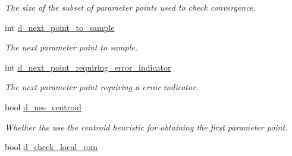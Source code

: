 \begin{DoxyCompactItemize}
\begin{DoxyCompactList}\small\item\em The size of the subset of parameter points used to check convergence. \end{DoxyCompactList}\item 
\hypertarget{class_c_a_r_o_m_1_1_greedy_parameter_point_sampler_a4c1e76ffb0c6063881c48e05813dc017}{int \hyperlink{class_c_a_r_o_m_1_1_greedy_parameter_point_sampler_a4c1e76ffb0c6063881c48e05813dc017}{d\-\_\-next\-\_\-point\-\_\-to\-\_\-sample}}\label{class_c_a_r_o_m_1_1_greedy_parameter_point_sampler_a4c1e76ffb0c6063881c48e05813dc017}

\begin{DoxyCompactList}\small\item\em The next parameter point to sample. \end{DoxyCompactList}\item 
\hypertarget{class_c_a_r_o_m_1_1_greedy_parameter_point_sampler_aa63b949f0aca2ce9cb5094145f47a971}{int \hyperlink{class_c_a_r_o_m_1_1_greedy_parameter_point_sampler_aa63b949f0aca2ce9cb5094145f47a971}{d\-\_\-next\-\_\-point\-\_\-requiring\-\_\-error\-\_\-indicator}}\label{class_c_a_r_o_m_1_1_greedy_parameter_point_sampler_aa63b949f0aca2ce9cb5094145f47a971}

\begin{DoxyCompactList}\small\item\em The next parameter point requiring a error indicator. \end{DoxyCompactList}\item 
\hypertarget{class_c_a_r_o_m_1_1_greedy_parameter_point_sampler_ab893f1c468c41af38577a371f98459bc}{bool \hyperlink{class_c_a_r_o_m_1_1_greedy_parameter_point_sampler_ab893f1c468c41af38577a371f98459bc}{d\-\_\-use\-\_\-centroid}}\label{class_c_a_r_o_m_1_1_greedy_parameter_point_sampler_ab893f1c468c41af38577a371f98459bc}

\begin{DoxyCompactList}\small\item\em Whether the use the centroid heuristic for obtaining the first parameter point. \end{DoxyCompactList}\item 
\hypertarget{class_c_a_r_o_m_1_1_greedy_parameter_point_sampler_a9bcf71915dec831c26890a9ab31803e5}{bool \hyperlink{class_c_a_r_o_m_1_1_greedy_parameter_point_sampler_a9bcf71915dec831c26890a9ab31803e5}{d\-\_\-check\-\_\-local\-\_\-rom}}\label{class_c_a_r_o_m_1_1_greedy_parameter_point_sampler_a9bcf71915dec831c26890a9ab31803e5}


\end{DoxyCompactItemize}
